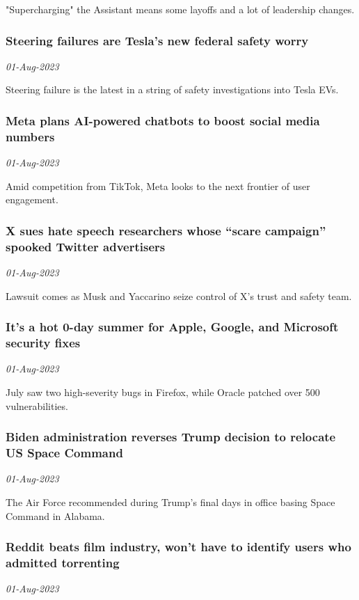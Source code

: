 "Supercharging" the Assistant means some layoffs and a lot of leadership changes.
\subsubsection{Steering failures are Tesla’s new federal safety worry \href{https://arstechnica.com/?p=1958188}{}}
\textit{01-Aug-2023}

Steering failure is the latest in a string of safety investigations into Tesla EVs.
\subsubsection{Meta plans AI-powered chatbots to boost social media numbers \href{https://arstechnica.com/?p=1958059}{}}
\textit{01-Aug-2023}

Amid competition from TikTok, Meta looks to the next frontier of user engagement.
\subsubsection{X sues hate speech researchers whose “scare campaign” spooked Twitter advertisers \href{https://arstechnica.com/?p=1958122}{}}
\textit{01-Aug-2023}

Lawsuit comes as Musk and Yaccarino seize control of X's trust and safety team.
\subsubsection{It’s a hot 0-day summer for Apple, Google, and Microsoft security fixes \href{https://arstechnica.com/?p=1958098}{}}
\textit{01-Aug-2023}

July saw two high-severity bugs in Firefox, while Oracle patched over 500 vulnerabilities.
\subsubsection{Biden administration reverses Trump decision to relocate US Space Command \href{https://arstechnica.com/?p=1958048}{}}
\textit{01-Aug-2023}

The Air Force recommended during Trump's final days in office basing Space Command in Alabama.
\subsubsection{Reddit beats film industry, won’t have to identify users who admitted torrenting \href{https://arstechnica.com/?p=1958087}{}}
\textit{01-Aug-2023}

